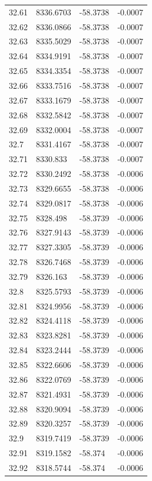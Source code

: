 \begin{table}[H]
\begin{tabular}{llll}
32.61 & 8336.6703 & -58.3738 & -0.0007 \\
32.62 & 8336.0866 & -58.3738 & -0.0007 \\
32.63 & 8335.5029 & -58.3738 & -0.0007 \\
32.64 & 8334.9191 & -58.3738 & -0.0007 \\
32.65 & 8334.3354 & -58.3738 & -0.0007 \\
32.66 & 8333.7516 & -58.3738 & -0.0007 \\
32.67 & 8333.1679 & -58.3738 & -0.0007 \\
32.68 & 8332.5842 & -58.3738 & -0.0007 \\
32.69 & 8332.0004 & -58.3738 & -0.0007 \\
32.7 & 8331.4167 & -58.3738 & -0.0007 \\
32.71 & 8330.833 & -58.3738 & -0.0007 \\
32.72 & 8330.2492 & -58.3738 & -0.0006 \\
32.73 & 8329.6655 & -58.3738 & -0.0006 \\
32.74 & 8329.0817 & -58.3738 & -0.0006 \\
32.75 & 8328.498 & -58.3739 & -0.0006 \\
32.76 & 8327.9143 & -58.3739 & -0.0006 \\
32.77 & 8327.3305 & -58.3739 & -0.0006 \\
32.78 & 8326.7468 & -58.3739 & -0.0006 \\
32.79 & 8326.163 & -58.3739 & -0.0006 \\
32.8 & 8325.5793 & -58.3739 & -0.0006 \\
32.81 & 8324.9956 & -58.3739 & -0.0006 \\
32.82 & 8324.4118 & -58.3739 & -0.0006 \\
32.83 & 8323.8281 & -58.3739 & -0.0006 \\
32.84 & 8323.2444 & -58.3739 & -0.0006 \\
32.85 & 8322.6606 & -58.3739 & -0.0006 \\
32.86 & 8322.0769 & -58.3739 & -0.0006 \\
32.87 & 8321.4931 & -58.3739 & -0.0006 \\
32.88 & 8320.9094 & -58.3739 & -0.0006 \\
32.89 & 8320.3257 & -58.3739 & -0.0006 \\
32.9 & 8319.7419 & -58.3739 & -0.0006 \\
32.91 & 8319.1582 & -58.374 & -0.0006 \\
32.92 & 8318.5744 & -58.374 & -0.0006 \\

\end{tabular}
\end{table}
